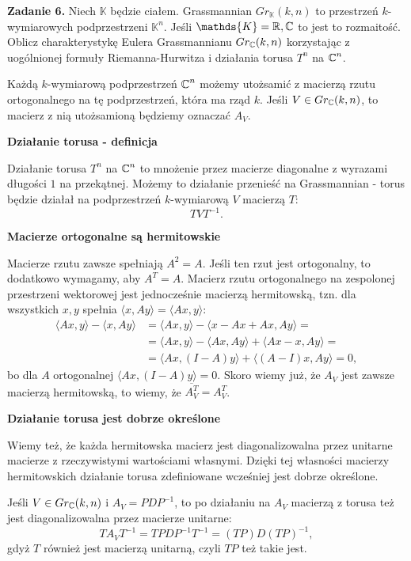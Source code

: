 \textbf{\large\color{orange}Zadanie 6.} Niech $\mathds{K}$ będzie ciałem. Grassmannian $Gr_{\mathds{K}}(k,n)$ to przestrzeń $k$-wymiarowych podprzestrzeni $\mathds{K}^n$. Jeśli $\mathds{K}=\R,\C$ to jest to rozmaitość. Oblicz charakterystykę Eulera Grassmannianu $Gr_{\operatorname{\mathbb{C}}}(k,n)$ korzystając z uogólnionej formuły Riemanna-Hurwitza i działania torusa $T^n$ na $\operatorname{\mathbb{C}}^n$.

\dotfill 

Każdą $k$-wymiarową podprzestrzeń $\operatorname{\mathbb{C}}^n$ możemy utożsamić z macierzą rzutu ortogonalnego na tę podprzestrzeń, która ma rząd $k$. Jeśli $V\in Gr_{\operatorname{\mathbb{C}}}(k,n)$, to macierz z nią utożsamioną będziemy oznaczać $A_V$.

\textbf{\color{green}Działanie torusa - definicja}

Działanie torusa $T^n$ na $\operatorname{\mathbb{C}}^n$ to mnożenie przez macierze diagonalne z wyrazami długości $1$ na przekątnej. Możemy to działanie przenieść na Grassmannian - torus będzie działał na podprzestrzeń $k$-wymiarową $V$ macierzą $T$:
$$TVT^{-1}.$$

\textbf{\color{green}Macierze ortogonalne są hermitowskie}

Macierze rzutu zawsze spełniają $A^2=A$. Jeśli ten rzut jest ortogonalny, to dodatkowo wymagamy, aby $A^T=A$. Macierz rzutu ortogonalnego na zespolonej przestrzeni wektorowej jest jednocześnie macierzą hermitowską, tzn. dla wszystkich $x,y$ spełnia $\langle x, Ay\rangle = \langle Ax, y\rangle$:
\begin{align*}
  \langle Ax, y\rangle -\langle x, Ay\rangle &= \langle Ax, y\rangle -\langle x-Ax+Ax, Ay\rangle=\\ 
  &=\langle Ax, y\rangle -\langle Ax, Ay\rangle + \langle Ax-x, Ay\rangle=\\ 
  &=\langle Ax, (I-A)y\rangle + \langle (A-I)x, Ay\rangle=0,
\end{align*}
bo dla $A$ ortogonalnej $\langle Ax, (I-A)y\rangle =0$. Skoro wiemy już, że $A_V$ jest zawsze macierzą hermitowską, to wiemy, że $\overline{A_V^T}=A_V^T$.

\textbf{\color{green}Działanie torusa jest dobrze określone}

Wiemy też, że każda hermitowska macierz jest diagonalizowalna przez unitarne macierze z rzeczywistymi wartościami własnymi. Dzięki tej własności macierzy hermitowskich działanie torusa zdefiniowane wcześniej jest dobrze określone.

Jeśli $V\in Gr_{\operatorname{\mathbb{C}}}(k,n)$ i $A_V=PDP^{-1}$, to po działaniu na $A_V$ macierzą z torusa też jest diagonalizowalna przez macierze unitarne:
$$TA_VT^{-1}=TPDP^{-1}T^{-1}=(TP)D(TP)^{-1},$$
gdyż $T$ również jest macierzą unitarną, czyli $TP$ też takie jest.

